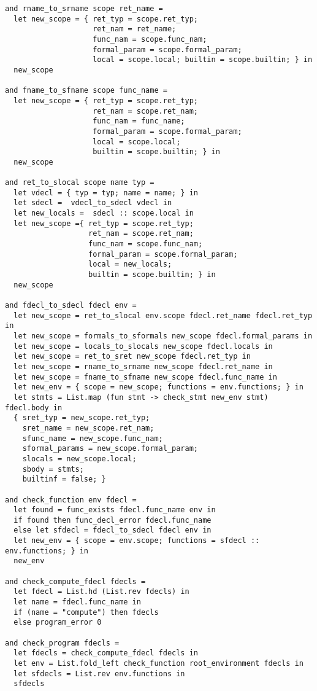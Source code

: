 \begin{lstlisting}
and rname_to_srname scope ret_name =
  let new_scope = { ret_typ = scope.ret_typ;
                    ret_nam = ret_name;
                    func_nam = scope.func_nam;
                    formal_param = scope.formal_param;
                    local = scope.local; builtin = scope.builtin; } in
  new_scope

and fname_to_sfname scope func_name =
  let new_scope = { ret_typ = scope.ret_typ;
                    ret_nam = scope.ret_nam;
                    func_nam = func_name;
                    formal_param = scope.formal_param;
                    local = scope.local;
                    builtin = scope.builtin; } in
  new_scope

and ret_to_slocal scope name typ =
  let vdecl = { typ = typ; name = name; } in
  let sdecl =  vdecl_to_sdecl vdecl in
  let new_locals =  sdecl :: scope.local in
  let new_scope ={ ret_typ = scope.ret_typ; 
                   ret_nam = scope.ret_nam;
                   func_nam = scope.func_nam;
                   formal_param = scope.formal_param;
                   local = new_locals;
                   builtin = scope.builtin; } in
  new_scope

and fdecl_to_sdecl fdecl env = 
  let new_scope = ret_to_slocal env.scope fdecl.ret_name fdecl.ret_typ in
  let new_scope = formals_to_sformals new_scope fdecl.formal_params in
  let new_scope = locals_to_slocals new_scope fdecl.locals in
  let new_scope = ret_to_sret new_scope fdecl.ret_typ in
  let new_scope = rname_to_srname new_scope fdecl.ret_name in
  let new_scope = fname_to_sfname new_scope fdecl.func_name in
  let new_env = { scope = new_scope; functions = env.functions; } in
  let stmts = List.map (fun stmt -> check_stmt new_env stmt) fdecl.body in
  { sret_typ = new_scope.ret_typ;
    sret_name = new_scope.ret_nam;
    sfunc_name = new_scope.func_nam;
    sformal_params = new_scope.formal_param;
    slocals = new_scope.local;
    sbody = stmts;
    builtinf = false; }

and check_function env fdecl =
  let found = func_exists fdecl.func_name env in
  if found then func_decl_error fdecl.func_name
  else let sfdecl = fdecl_to_sdecl fdecl env in
  let new_env = { scope = env.scope; functions = sfdecl :: env.functions; } in
  new_env

and check_compute_fdecl fdecls =
  let fdecl = List.hd (List.rev fdecls) in 
  let name = fdecl.func_name in
  if (name = "compute") then fdecls
  else program_error 0

and check_program fdecls =
  let fdecls = check_compute_fdecl fdecls in
  let env = List.fold_left check_function root_environment fdecls in
  let sfdecls = List.rev env.functions in
  sfdecls
\end{lstlisting}


